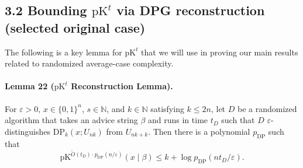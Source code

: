 \documentclass[10pt,a4paper]{article}
\begin{document}
\subsection*{3.2 Bounding $\mathrm{pK}^t$ via DPG reconstruction (selected original case)}
The following is a key lemma for $\mathrm{pK}^t$ that we will use in proving our main results related to randomized average-case complexity.
\paragraph{Lemma 22 ($\mathrm{pK}^t$ Reconstruction Lemma).} For $\varepsilon>0$, $x\in\{0,1\}^n$, $s\in\mathbb N$, and $k\in\mathbb N$ satisfying $k\leq2n$, let $D$ be a randomized algorithm that takes an advice string $\beta$ and runs in time $t_D$ such that $D$ $\varepsilon$-distinguishes $\mathrm{DP}_k(x;U_{nk})$ from $U_{nk+k}$. Then there is a polynomial $p_{\mathrm{DP}}$ such that
\[\mathrm{pK}^{\widetilde O(t_D)\cdot p_{\mathrm{DP}}(n/\varepsilon)}(x\mid\beta)\leq k+\log p_{\mathrm{DP}}(nt_D/\varepsilon).\]
\end{document}
